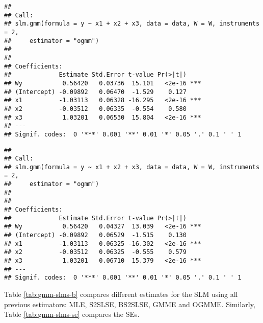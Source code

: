 \begin{knitrout}
\begin{kframe}
\begin{alltt}
  \hlstd{=} \hlstd{)}
\end{alltt}
\begin{verbatim}
## 
## Call:
## slm.gmm(formula = y ~ x1 + x2 + x3, data = data, W = W, instruments = 2, 
##     estimator = "ogmm")
## 
## 
## Coefficients:
##             Estimate Std.Error t-value Pr(>|t|)    
## Wy           0.56420   0.03736  15.101   <2e-16 ***
## (Intercept) -0.09892   0.06470  -1.529    0.127    
## x1          -1.03113   0.06328 -16.295   <2e-16 ***
## x2          -0.03512   0.06335  -0.554    0.580    
## x3           1.03201   0.06530  15.804   <2e-16 ***
## ---
## Signif. codes:  0 '***' 0.001 '**' 0.01 '*' 0.05 '.' 0.1 ' ' 1
\end{verbatim}
\begin{alltt}
  \hlstd{=} \hlstd{)}
\end{alltt}
\begin{verbatim}
## 
## Call:
## slm.gmm(formula = y ~ x1 + x2 + x3, data = data, W = W, instruments = 2, 
##     estimator = "ogmm")
## 
## 
## Coefficients:
##             Estimate Std.Error t-value Pr(>|t|)    
## Wy           0.56420   0.04327  13.039   <2e-16 ***
## (Intercept) -0.09892   0.06529  -1.515    0.130    
## x1          -1.03113   0.06325 -16.302   <2e-16 ***
## x2          -0.03512   0.06325  -0.555    0.579    
## x3           1.03201   0.06710  15.379   <2e-16 ***
## ---
## Signif. codes:  0 '***' 0.001 '**' 0.01 '*' 0.05 '.' 0.1 ' ' 1
\end{verbatim}
\end{kframe}
\end{knitrout}

Table \ref{tab:gmm-slms-b} compares different estimates for the SLM using all previous estimators: MLE, S2SLSE, BS2SLSE, GMME and OGMME. Similarly, Table \ref{tab:gmm-slms-se} compares the SEs. 

